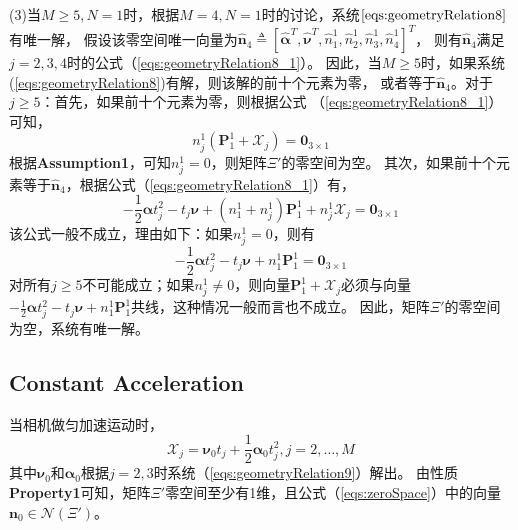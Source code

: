 \documentclass{article}
\begin{document}
\par
(3)当$M\geqslant 5, N=1$时，根据$M=4,N=1$时的讨论，系统$\ref{eqs:geometryRelation8}$有唯一解，
假设该零空间唯一向量为$\hat{\textbf{n}}_4\triangleq \left[\hat{\mathbf{\alpha}}^T,
\hat{\mathbf{\nu}}^T,\hat{n}_1^1,\hat{n}_2^1,\hat{n}_3^1,\hat{n}_4^1\right]^T$，
则有$\hat{\textbf{n}}_4$满足$j=2,3,4$时的公式（\ref{eqs:geometryRelation8_1}）。
因此，当$M\geqslant 5$时，如果系统(\ref{eqs:geometryRelation8})有解，则该解的前十个元素为零，
或者等于$\hat{\textbf{n}}_4$。对于$j\geqslant 5$：首先，如果前十个元素为零，则根据公式
（\ref{eqs:geometryRelation8_1}）可知，
\begin{equation}
    n_j^1(\textbf{P}_1^1+\mathcal{X}_j)=\textbf{0}_{3\times 1}
\end{equation}
根据\textbf{Assumption1}，可知$n_j^1=0$，则矩阵$\Xi'$的零空间为空。
其次，如果前十个元素等于$\hat{\textbf{n}}_4$，根据公式（\ref{eqs:geometryRelation8_1}）有，
\begin{equation}
    -\frac{1}{2}\mathbf{\alpha}t_j^2-t_j\mathbf{\nu}+(n_1^1+n_j^1)\textbf{P}_1^1+n_j^1\mathcal{X}_j=\textbf{0}_{3\times 1}
\end{equation}
该公式一般不成立，理由如下：如果$n_j^1=0$，则有
\begin{equation}
    -\frac{1}{2}\mathbf{\alpha}t_j^2-t_j\mathbf{\nu}+n_1^1\textbf{P}_1^1=\textbf{0}_{3\times 1}
\end{equation}
对所有$j\geqslant 5$不可能成立；如果$n_j^1\not=0$，则向量$\textbf{P}_1^1+\mathcal{X}_j$必须与向量
$-\frac{1}{2}\mathbf{\alpha}t_j^2-t_j\mathbf{\nu}+n_1^1\textbf{P}_1^1$共线，这种情况一般而言也不成立。
因此，矩阵$\Xi'$的零空间为空，系统有唯一解。

\subsection{Constant Acceleration}
当相机做匀加速运动时，
\begin{equation}\label{eqs:constAcc}
    \mathcal{X}_j=\mathbf{\nu}_{0}t_j+\frac{1}{2}\mathbf{\alpha}_{0}t_j^2,j=2,\dots,M
\end{equation}
其中$\mathbf{\nu}_0$和$\mathbf{\alpha}_0$根据$j=2,3$时系统（\ref{eqs:geometryRelation9}）解出。
由性质\textbf{Property1}可知，矩阵$\Xi'$零空间至少有1维，且公式（\ref{eqs:zeroSpace}）中的向量
$\textbf{n}_0\in \mathcal{N}(\Xi')$。
\end{document}
